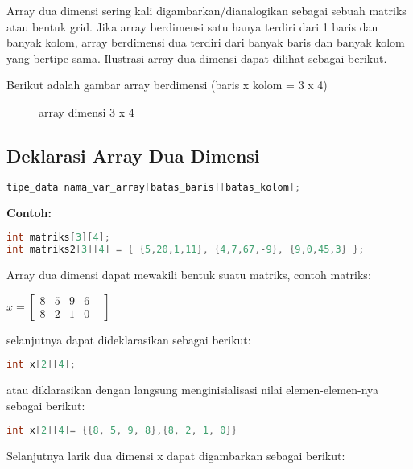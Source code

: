 Array dua dimensi sering kali digambarkan/dianalogikan sebagai sebuah
matriks atau bentuk grid. Jika array berdimensi satu hanya terdiri dari
1 baris dan banyak kolom, array berdimensi dua terdiri dari banyak baris
dan banyak kolom yang bertipe sama. Ilustrasi array dua dimensi dapat
dilihat sebagai berikut.

Berikut adalah gambar array berdimensi (baris x kolom = 3 x 4)

\begin{figure}[htbp]
\centering
{}
\label{gambar3-3}
\caption{array dimensi 3 x 4}
\end{figure}

\subsection{Deklarasi Array Dua Dimensi}\label{deklarasi-array-dua-dimensi}

\begin{lstlisting}[language=c++, numbers=none]
tipe_data nama_var_array[batas_baris][batas_kolom];
\end{lstlisting}

\textbf{Contoh:}

\begin{lstlisting}[language=c++, numbers=none]
int matriks[3][4];
int matriks2[3][4] = { {5,20,1,11}, {4,7,67,-9}, {9,0,45,3} };
\end{lstlisting}

Array dua dimensi dapat mewakili bentuk suatu matriks, contoh matriks:


$x=
\begin{bmatrix}
8 &5& 9 & 6 & \\
8 & 2 & 1 & 0
\end{bmatrix}$

selanjutnya dapat dideklarasikan sebagai berikut:

\begin{lstlisting}[language=c++]
int x[2][4];
\end{lstlisting}

atau diklarasikan dengan langsung menginisialisasi nilai
elemen-elemen-nya sebagai berikut:

\begin{lstlisting}[language=c++, numbers=none]
int x[2][4]= {{8, 5, 9, 8},{8, 2, 1, 0}}
\end{lstlisting}

Selanjutnya larik dua dimensi x dapat digambarkan sebagai berikut:


